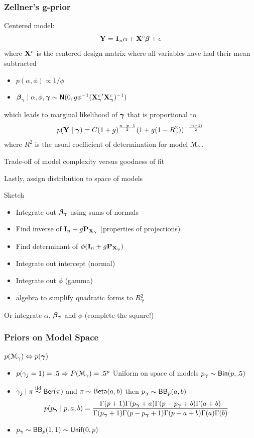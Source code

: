 \documentclass[]{beamer}
\begin{document}
\begin{frame}\frametitle{Zellner's g-prior}
  Centered model:  $$\mathbf{Y} = \mathbf{1}_n \alpha + \mathbf{X}^c \boldsymbol{\beta} + \epsilon$$
  where $\mathbf{X}^c$ is the centered design matrix where all variables have
  had their mean subtracted \pause
\begin{itemize}
\item   $p(\alpha, \phi) \propto 1/\phi$ \pause
\item  $\boldsymbol{\beta}_\gamma \mid \alpha, \phi, \boldsymbol{\gamma} \sim \textsf{N}(0, g \phi^{-1}
  ({\mathbf{X}_{\boldsymbol{\gamma}}^c}^\prime \mathbf{X}_{\boldsymbol{\gamma}}^c)^{-1})$ \pause
\end{itemize}
which leads to marginal likelihood of $\boldsymbol{\gamma}$ that is proportional
to $$ p(\mathbf{Y} \mid \boldsymbol{\gamma}) = C (1 + g)^{\frac{n-p-1}{2}} ( 1 + g (1 -
 R^2_\gamma))^{- \frac{(n-1)}{2}}$$
where $R^2$ is the usual coefficient of determination for model ${\cal M}_\gamma$.
\pause

Trade-off of model complexity versus goodness of fit

\bigskip
Lastly, assign distribution to space of models
\end{frame}

\begin{frame}{Sketch}
\begin{itemize}
  \item  Integrate out $\boldsymbol{\beta_\gamma}$  using sums of normals \pause
  \item  Find inverse of $\mathbf{I}_n + g \mathbf{P}_{\mathbf{X}_{\boldsymbol{\gamma}}}$  (properties of projections) \pause
  \item Find determinant of $\phi (\mathbf{I}_n + g \mathbf{P}_{\mathbf{X}_{\boldsymbol{\gamma}}})$  \pause
  \item Integrate out intercept (normal)  \pause
  \item Integrate out $\phi$  (gamma)  \pause
  \item algebra to simplify quadratic forms to  $R^2_{\boldsymbol{\gamma}}$
\end{itemize}

Or integrate $\alpha$, $\boldsymbol{\beta_\gamma}$ and $\phi$  (complete the square!)
\end{frame}
\begin{frame}
  \frametitle{Priors on Model Space}
  $p({\cal M}_\gamma) \Leftrightarrow p(\boldsymbol{\gamma})$
  \begin{itemize}
  \item $p(\gamma_j = 1) = .5 \Rightarrow P({\cal M}_\gamma) = .5^p$  Uniform on space of models \pause $p_{\boldsymbol{\gamma}} \sim \textsf{Bin}(p, .5)$
\item $\gamma_j \mid \pi \mathrel{\mathop{\sim}\limits^{\rm iid}} \textsf{Ber}(\pi)$ and $\pi \sim \textsf{Beta}(a,b)$ then  $p_{\boldsymbol{\gamma}} \sim \textsf{BB}_p(a, b)$
$$
p(p_{\boldsymbol{\gamma}} \mid p, a, b) = \frac{ \Gamma(p + 1) \Gamma(p_{\boldsymbol{\gamma}} + a) \Gamma(p - p_{\boldsymbol{\gamma}} + b) \Gamma (a + b) }{\Gamma(p_{\boldsymbol{\gamma}}+1) \Gamma(p - p_{\boldsymbol{\gamma}} + 1) \Gamma(p + a + b) \Gamma(a) \Gamma(b)}
$$
\item $p_{\boldsymbol{\gamma}} \sim \textsf{BB}_p(1, 1) \sim \textsf{Unif}(0, p)$
  \end{itemize}
\end{frame}
\end{document}
